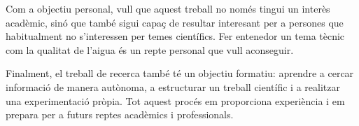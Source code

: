Com a objectiu personal, vull que aquest treball no només tingui un interès acadèmic, sinó que també sigui capaç de resultar interesant per a persones que habitualment no s’interessen per temes científics. Fer entenedor un tema tècnic com la qualitat de l’aigua és un repte personal que vull aconseguir.

Finalment, el treball de recerca també té un objectiu formatiu: aprendre a cercar informació de manera autònoma, a estructurar un treball científic i a realitzar una experimentació pròpia. Tot aquest procés em proporciona experiència i em prepara per a futurs reptes acadèmics i professionals.


